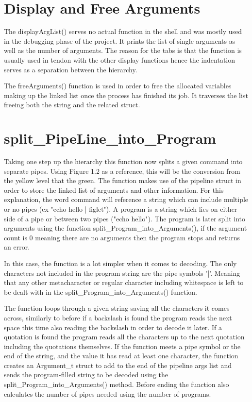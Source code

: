 \documentclass[12pt, a4paper]{report}
\begin{document}
\section{Display and Free Arguments}
The displayArgList() serves no actual function in the shell and was mostly used in the debugging phase of the project. It prints the list of single arguments as well as the number of arguments. The reason for the tabs is that the function is usually used in tendon with the other display functions hence the indentation serves as a separation between the hierarchy.

The freeArguments() function is used in order to free the allocated variables making up the linked list once the process has finished its job. It traverses the list freeing both the string and the related struct.

\section{split\_PipeLine\_into\_Program}
Taking one step up the hierarchy this function now splits a given command into separate pipes. Using Figure 1.2 as a reference, this will be the conversion from the yellow level that the green. The function makes use of the pipeline struct in order to store the linked list of arguments and other information. For this explanation, the word command will reference a string which can include multiple or no pipes (ex "echo hello | figlet"). A program is a string which lies on either side of a pipe or between two pipes ("echo hello"). The program is later split into arguments using the function split\_Program\_into\_Arguments(), if the argument count is 0 meaning there are no arguments then the program stops and returns an error.

In this case, the function is a lot simpler when it comes to decoding. The only characters not included in the program string are the pipe symbols '|'. Meaning that any other metacharacter or regular character including whitespace is left to be dealt with in the split\_Program\_into\_Arguments() function. 

The function loops through a given string saving all the characters it comes across, similarly to before if a backslash is found the program reads the next space this time also reading the backslash in order to decode it later. If a quotation is found the program reads all the characters up to the next quotation including the quotations themselves. If the function meets a pipe symbol or the end of the string, and the value it has read at least one character, the function creates an Argument\_t struct to add to the end of the pipeline args list and sends the program-filled string to be decoded using the split\_Program\_into\_Arguments() method. Before ending the function also calculates the number of pipes needed using the number of programs.
\end{document}

